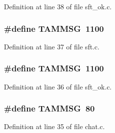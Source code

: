 Definition at line 38 of file sft\_\-ok.c.

\hypertarget{group__tools_gafeedb41f2b3a57bebfb2f7b06e740ff9}{
\subsubsection[{TAMMSG}]{\setlength{\rightskip}{0pt plus 5cm}\#define TAMMSG~1100}}
\label{group__tools_gafeedb41f2b3a57bebfb2f7b06e740ff9}


Definition at line 37 of file sft.c.

\hypertarget{group__tools_gafeedb41f2b3a57bebfb2f7b06e740ff9}{
\subsubsection[{TAMMSG}]{\setlength{\rightskip}{0pt plus 5cm}\#define TAMMSG~1100}}
\label{group__tools_gafeedb41f2b3a57bebfb2f7b06e740ff9}


Definition at line 36 of file sft\_\-ok.c.

\hypertarget{group__tools_gafeedb41f2b3a57bebfb2f7b06e740ff9}{
\subsubsection[{TAMMSG}]{\setlength{\rightskip}{0pt plus 5cm}\#define TAMMSG~80}}
\label{group__tools_gafeedb41f2b3a57bebfb2f7b06e740ff9}


Definition at line 35 of file chat.c.



